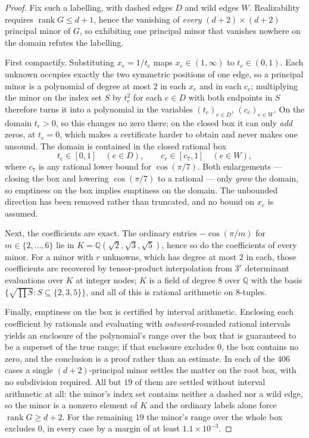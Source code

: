 \documentclass[11pt,reqno]{amsart}
\theoremstyle{plain}
\theoremstyle{definition}
\DeclareMathOperator{\rank}{rank}
\newcommand{\QQ}{\mathbb{Q}}
\newcommand{\Gr}{G}
\newcommand{\WildRootBox}{19}
\newcommand{\WildMinMargin}{1.1\times10^{-3}}
\newcommand{\NumWild}{406}
\begin{document}
\begin{proof}
Fix such a labelling, with dashed edges $D$ and wild edges $W$. Realizability
requires $\rank\Gr\le d+1$, hence the vanishing of \emph{every} $(d+2)\times(d+2)$
principal minor of $\Gr$, so exhibiting one principal minor that vanishes nowhere
on the domain refutes the labelling.

First compactify. Substituting $x_e = 1/t_e$ maps $x_e\in(1,\infty)$ to
$t_e\in(0,1)$. Each unknown occupies exactly the two symmetric positions of one
edge, so a principal minor is a polynomial of degree at most $2$ in each $x_e$ and
in each $c_e$; multiplying the minor on the index set $S$ by $t_e^{2}$ for each
$e\in D$ with both endpoints in $S$ therefore turns it into a polynomial in the
variables $(t_e)_{e\in D}$, $(c_e)_{e\in W}$. On the domain $t_e>0$, so this
changes no zero there; on the closed box it can only \emph{add} zeros, at
$t_e=0$, which makes a certificate harder to obtain and never makes one unsound.
The domain is contained in the closed rational box
\[
t_e\in[0,1]\quad(e\in D),\qquad c_e\in[c_7,1]\quad(e\in W),
\]
where $c_7$ is any rational lower bound for $\cos(\pi/7)$. Both enlargements ---
closing the box and lowering $\cos(\pi/7)$ to a rational --- only \emph{grow} the
domain, so emptiness on the box implies emptiness on the domain. The unbounded
direction has been removed rather than truncated, and no bound on $x_e$ is
assumed.

Next, the coefficients are exact. The ordinary entries $-\cos(\pi/m)$ for
$m\in\{2,\dots,6\}$ lie in $K=\QQ(\sqrt2,\sqrt3,\sqrt5)$, hence so do the
coefficients of every minor. For a minor with $r$ unknowns, which has degree at
most $2$ in each, those coefficients are recovered by tensor-product interpolation
from $3^{r}$ determinant evaluations over $K$ at integer nodes; $K$ is a field of
degree $8$ over $\QQ$ with the basis $\{\sqrt{\prod S}: S\subseteq\{2,3,5\}\}$, and
all of this is rational arithmetic on $8$-tuples.

Finally, emptiness on the box is certified by interval arithmetic. Enclosing each
coefficient by rationals and evaluating with \emph{outward}-rounded rational
intervals yields an enclosure of the polynomial's range over the box that is
guaranteed to be a superset of the true range; if that enclosure excludes $0$, the
box contains no zero, and the conclusion is a proof rather than an estimate. In
each of the $\NumWild$ cases a single $(d+2)$-principal minor settles the matter on
the root box, with no subdivision required. All but $\WildRootBox$ of them are
settled without interval arithmetic at all: the minor's index set contains neither a
dashed nor a wild edge, so the minor is a nonzero element of $K$ and the ordinary
labels alone force $\rank\Gr\ge d+2$. For the remaining $\WildRootBox$ the minor's
range over the whole box excludes $0$, in every case by a margin of at least
$\WildMinMargin$.
\end{proof}
\end{document}
